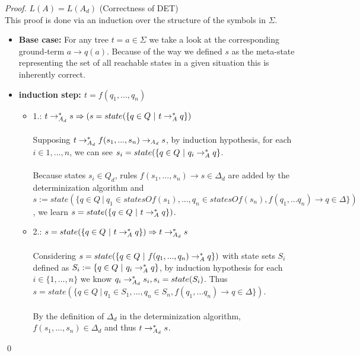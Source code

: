 \documentclass{llncs}
\begin{document}
\begin{proof}{\(L(A) = L(A_d)\) (Correctness of DET) \cite{tata-nfta}}\\
	This proof is done via an induction over the structure of the symbols in \(\Sigma\).
	\begin{itemize}
		\item \textbf{Base case:}
			For any tree \(t = a \in \Sigma\) we take a look at the corresponding ground-term \(a \rightarrow q(a)\). Because of the way we defined \(s\) as the meta-state representing the set of all reachable states in a given situation this is inherently correct.
			\\
		\item \textbf{induction step: \(t = f(q_1,... , q_n)\)}
			\begin{itemize}
				\item 
				1.: \(t \rightarrow_{A_d}^* s \Rightarrow (s = state(\{q \in Q ~|~ t \rightarrow_A^* q\})\)\\\\
				Supposing \(t \rightarrow_{A_d}^* f(s_1, ..., s_n) \rightarrow_{A_d} s\), by induction hypothesis, for each \(i \in {1,..., n}\), we can see \(s_i = state(\{q \in Q ~|~ q_i \rightarrow_A^* q\}\).\\
				\\
			    Because states \(s_i \in Q_d\), rules \(f(s_1, ..., s_n) \rightarrow s \in \Delta_d\) are added by the determinization algorithm and \( s := state(\{ q \in Q ~|~ q_1 \in statesOf(s_1),..., q_n \in statesOf(s_n), f(q_1,...q_n) \rightarrow q \in \Delta \}) \), we learn \(s = state(\{q \in Q ~|~ t \rightarrow_A^* q\})\).
				\\
				\item
				2.: \(s = state(\{q \in Q ~|~ t \rightarrow_A^* q\}) \Rightarrow t \rightarrow_{A_d}^* s\)\\\\
				Considering \(s = state(\{q \in Q ~|~ f(q_1, ..., q_n) \rightarrow_A^* q\})\) with state sets \(S_i\) defined as \(S_i := \{q \in Q ~|~ q_i \rightarrow_A^* q\}\), by induction hypothesis for each \(i \in \{1, ..., n\}\) we know \(q_i \rightarrow_{A_d}^* s_i, s_i = state(S_i)\).
				Thus \( s = state(\{ q \in Q ~|~ q_1 \in S_1,..., q_n \in S_n, f(q_1,...q_n) \rightarrow q \in \Delta \}) \).\\
				\\
				By the definition of \(\Delta_d\) in the determinization algorithm, \(f(s_1, ..., s_n) \in \Delta_d\) and thus \(t \rightarrow_{A_d}^* s\).
			\end{itemize}
	\end{itemize}
	\qed
\end{proof}
\end{document}
